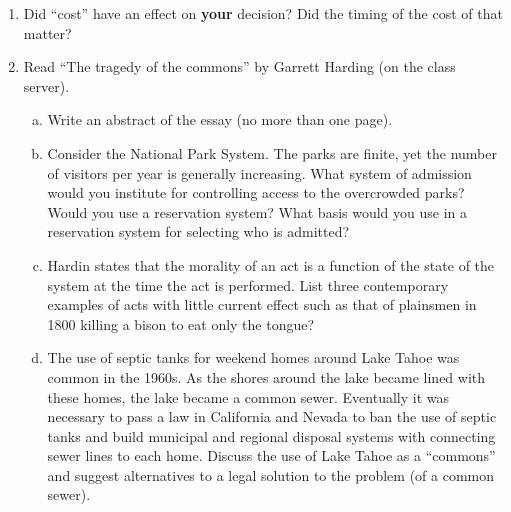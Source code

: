 \documentclass[12pt]{article}
\begin{document}
\begin{enumerate}
\item Did ``cost'' have an effect on \textbf{your} decision?   Did the timing of the cost of that matter?   
\item Read ``The tragedy of the commons'' by Garrett Harding (on the class server). 
\begin{enumerate}[a)]
\item Write an abstract of the essay (no more than one page).
\item Consider the National Park System.  The parks are finite, yet the number of visitors per year is generally increasing.  What system of admission would you institute for controlling access to the overcrowded parks?  Would you use a reservation system?  What basis would you use in a reservation system for selecting who is admitted?
\item Hardin states that the morality of an act is a function of the state of the system at the time the act is performed.  List three contemporary examples of acts with little current effect such as that of plainsmen in 1800 killing a bison to eat only the tongue?
\item The use of septic tanks for  weekend homes around Lake Tahoe was common in the 1960s.  As the shores around the lake became lined with these homes, the lake became a common sewer.  Eventually it was necessary to pass a law in California and Nevada to ban the use of septic tanks and build municipal and regional disposal systems with connecting sewer lines to each home.  Discuss the use of Lake Tahoe as a ``commons'' and suggest alternatives to a legal solution to the problem (of a common sewer).
\end{enumerate}

\end{enumerate}
\end{document}
